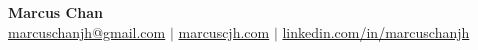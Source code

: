 \begin{center}
    \textbf{\Huge Marcus Chan} \\ \vspace{1pt}
    \small \href{mailto:marcuschanjh@gmail.com}{marcuschanjh@gmail.com} $|$ \href{https://marcuscjh.com}{marcuscjh.com} $|$ \href{https://www.linkedin.com/in/marcuschanjh}{linkedin.com/in/marcuschanjh}
\end{center}